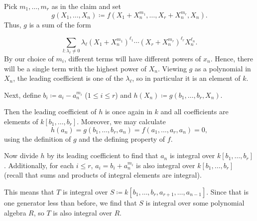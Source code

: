 Pick $m_1, \ldots, m_r$ as in the claim and set
\[ g(X_1, \ldots, X_n)\coloneqq f(X_1 + X_n^{m_1}, \ldots, X_r+X_n^{m_r}, X_n). \]
Thus, $g$ is a sum of the form

\[ \sum_{l\colon \lambda_\ell\neq 0} \lambda_\ell(X_1+X_n^{m_1})^{\ell_1}\cdots(X_r+X_n^{m_r})^{\ell_r}X_n^{\ell_n}. \]
By our choice of $m_i$, different terms will have different powers of $x_n$. Hence,
there will be a single term with the highest power of $X_n$. Viewing $g$ as a
polynomial in $X_n$, the leading coefficient is one of the $\lambda_{\ell}$, so
in particular it is an element of $k$.

Next, define $b_i\coloneqq a_i - a_n^{m_i}$ ($1\leq i\leq r$) and
$h(X_n) \coloneqq g(b_1, \ldots, b_r, X_n)$.

Then the leading coefficient of $h$ is once again in $k$ and all coefficients are
elements of $k[b_1, \ldots, b_r]$. Moreover, we may calculate
\[ h(a_n) = g(b_1, \ldots, b_r, a_n) = f(a_1, \ldots, a_r, a_n) = 0, \]
using the definition of $g$ and the defining property of $f$.

Now divide $h$ by its leading coefficient to find that $a_n$ is integral over
$k[b_1, \ldots, b_r]$. Additionally, for each $i\leq r$, $a_i = b_i + a_n^{m_i}$ is also
integral over $k[b_1, \ldots, b_r]$ (recall that sums and products of integral
elements are integral).

This means that $T$ is integral over $S\coloneqq k[b_1, \ldots, b_r, a_{r+1}, \ldots, a_{n-1}]$.
Since that is one generator less than before, we find that $S$ is integral over
some polynomial algebra $R$, so $T$ is also integral over $R$.
